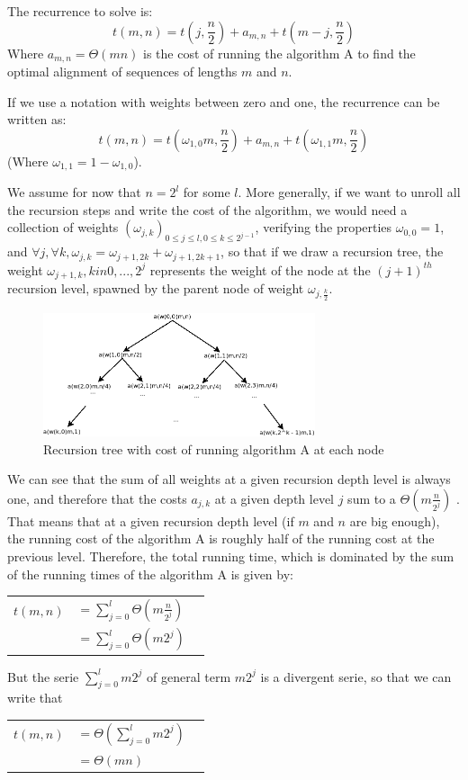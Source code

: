 The recurrence to solve is:
$$t(m,n) = t(j,\frac{n}{2}) + a_{m,n} + t(m-j,\frac{n}{2})$$
Where $a_{m,n} = \Theta(mn)$ is the cost of running the algorithm A to find the optimal alignment of sequences of lengths $m$ and $n$.

If we use a notation with weights between zero and one, the recurrence can be written as:
$$t(m,n) = t(\omega_{1,0} m,\frac{n}{2}) + a_{m,n} + t( \omega_{1,1}m,\frac{n}{2})$$
(Where $\omega_{1,1} = 1-\omega_{1,0}$).

We assume for now that $n=2^l$ for some $l$.
\newline
More generally, if we want to unroll all the recursion steps and write the cost of the algorithm, we would need a collection of weights $(\omega_{j,k})_{0 \leq j \leq l , 0 \leq k \leq 2^{j-1} }$, verifying the properties $\omega_{0,0} = 1$, and $\forall j, \forall k, \omega_{j,k} = \omega_{j+1, 2k} + \omega_{j+1, 2k+1}$, so that if we draw a recursion tree, the weight $\omega_{j+1,k}, k in 0,...,2^j$ represents the weight of the node at the $(j+1)^{th}$ recursion level, spawned by the parent node of weight $\omega_{j, \frac{k}{2}  }$.

\begin{figure}[h!]
\begin{center}
   \includegraphics[width=8cm]{recursionTree}
   \caption{Recursion tree with cost of running algorithm A at each node}
\end{center}
\end{figure}

We can see that the sum of all weights at a given recursion depth level is always one, and therefore that the costs $a_{j,k}$ at a given depth level $j$ sum to a $\Theta(m \frac{n}{2^j})$ . That means that at a given recursion depth level (if $m$ and $n$ are big enough), the running cost of the algorithm A is roughly half of the running cost at the previous level.
\newline
\newline
Therefore, the total running time, which is dominated by the sum of the running times of the algorithm A is given by:

\begin{tabular}{lll}
$t(m,n)$ & $ = \sum_{j=0}^{l} {\Theta(m \frac{n}{2^j})}$
\\ & $ = \sum_{j=0}^{l} { \Theta(m 2^j)}$
\end{tabular}


But the serie $\sum_{j=0}^{l} {m 2^j}$ of general term $m 2^j$ is a divergent serie, so that we can write that

\begin{tabular}{lll}
$t(m,n)$  & $ = \Theta( \sum_{j=0}^{l} { m 2^j } )$
\\ & $ = \Theta(mn)$
\end{tabular}

